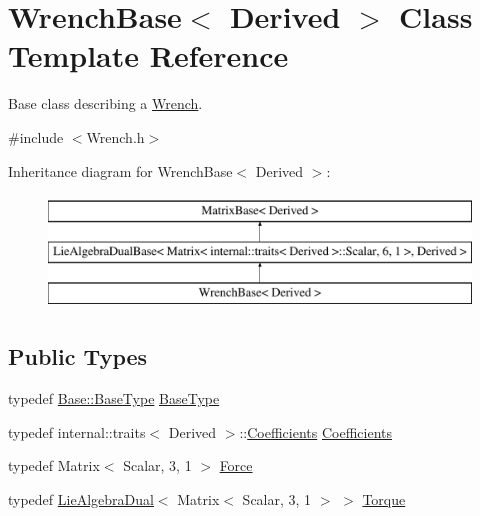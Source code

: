 \hypertarget{class_wrench_base}{}\section{Wrench\+Base$<$ Derived $>$ Class Template Reference}
\label{class_wrench_base}


Base class describing a \hyperlink{class_wrench}{Wrench}.  




{\ttfamily \#include $<$Wrench.\+h$>$}

Inheritance diagram for Wrench\+Base$<$ Derived $>$\+:\begin{figure}[H]
\begin{center}
\leavevmode
\includegraphics[height=3.000000cm]{class_wrench_base}
\end{center}
\end{figure}
\subsection*{Public Types}
\begin{DoxyCompactItemize}
\item 
typedef \hyperlink{class_lie_algebra_dual_base_3_01_matrix_3_01typename_01internal_1_1traits_3_01_derived_01_4_1_1_7557dc73cbfcbc32e399b9855a977d47_a9593517bd5d02d1330f7940eb5865eda}{Base\+::\+Base\+Type} \hyperlink{class_wrench_base_a8b98c467c6fb31bd7354dcbef134dca1}{Base\+Type}
\item 
typedef internal\+::traits$<$ Derived $>$\+::\hyperlink{class_wrench_base_a1041b592a70fd6bb5b19afbb418dfa69}{Coefficients} \hyperlink{class_wrench_base_a1041b592a70fd6bb5b19afbb418dfa69}{Coefficients}
\item 
typedef Matrix$<$ Scalar, 3, 1 $>$ \hyperlink{class_wrench_base_aa589699bbf0d18c023a0a2fe6482b4a7}{Force}
\item 
typedef \hyperlink{class_lie_algebra_dual}{Lie\+Algebra\+Dual}$<$ Matrix$<$ Scalar, 3, 1 $>$ $>$ \hyperlink{class_wrench_base_a8fa1b5e32e8418247118cc24be70d68d}{Torque}
\end{DoxyCompactItemize}

